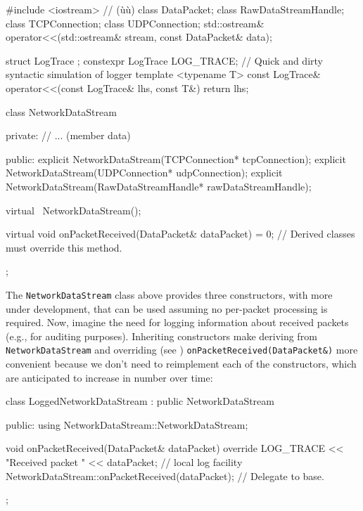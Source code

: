 \begin{emcppshiddenlisting}[emcppsbatch=e4]
#include <iostream>   // (ù{}ù)
class DataPacket;                                                               
class RawDataStreamHandle;                                                      
class TCPConnection;                                                            
class UDPConnection;
std::ostream& operator<<(std::ostream& stream, const DataPacket& data);

struct LogTrace {};
constexpr LogTrace LOG_TRACE; // Quick and dirty syntactic simulation of logger
template <typename T>
const LogTrace& operator<<(const LogTrace& lhs, const T&) { return lhs; }
\end{emcppshiddenlisting}
\begin{emcppslisting}[emcppsbatch=e4]
class NetworkDataStream
{
private:
    // ...                   (member data)

public:
    explicit NetworkDataStream(TCPConnection* tcpConnection);
    explicit NetworkDataStream(UDPConnection* udpConnection);
    explicit NetworkDataStream(RawDataStreamHandle* rawDataStreamHandle);

    virtual ~NetworkDataStream();

    virtual void onPacketReceived(DataPacket& dataPacket) = 0;
        // Derived classes must override this method.
};        
\end{emcppslisting}
    
\noindent The \lstinline!NetworkDataStream! class above provides three constructors, with more
under development, that can be used assuming no per-packet processing is
required. Now, imagine the need for logging information about received
packets (e.g., for auditing purposes). Inheriting constructors make
deriving from \lstinline!NetworkDataStream! and overriding (see ) 
\lstinline!onPacketReceived(DataPacket&)! more convenient because we don't need to reimplement each of the constructors, which are
anticipated to increase in number over time:

\begin{emcppslisting}[emcppsbatch=e4]
class LoggedNetworkDataStream : public NetworkDataStream
{
public:
    using NetworkDataStream::NetworkDataStream;

    void onPacketReceived(DataPacket& dataPacket) override
    {
        LOG_TRACE << "Received packet " << dataPacket;    // local log facility
        NetworkDataStream::onPacketReceived(dataPacket);  // Delegate to base.
    }
};
\end{emcppslisting}
    

